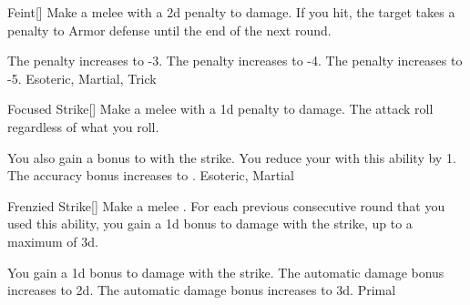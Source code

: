 \lowercase{\hypertarget{maneuver:Feint}{}}\label{maneuver:Feint}
\hypertarget{maneuver:Feint}{}
\begin{freeability}[Rank 1]{Feint}[]
Make a melee  with a \minus2d penalty to damage.
If you hit, the target takes a  penalty to Armor defense until the end of the next round.

\rankline
{} The penalty increases to -3.
 The penalty increases to -4.
 The penalty increases to -5.
 Esoteric, Martial, Trick
\end{freeability}
\vspace{0.25em}



\lowercase{\hypertarget{maneuver:Focused Strike}{}}\label{maneuver:Focused Strike}
\hypertarget{maneuver:Focused Strike}{}
\begin{freeability}[Rank 1]{Focused Strike}[]
Make a melee  with a \minus1d penalty to damage.
The attack roll  regardless of what you roll.

\rankline
{} You also gain a  bonus to  with the strike.
 You reduce your  with this ability by 1.
 The accuracy bonus increases to .
 Esoteric, Martial
\end{freeability}
\vspace{0.25em}



\lowercase{\hypertarget{maneuver:Frenzied Strike}{}}\label{maneuver:Frenzied Strike}
\hypertarget{maneuver:Frenzied Strike}{}
\begin{freeability}[Rank 1]{Frenzied Strike}[]
Make a melee .
For each previous consecutive round that you used this ability, you gain a \plus1d bonus to damage with the strike, up to a maximum of \plus3d.

\rankline
{} You gain a \plus1d bonus to damage with the strike.
 The automatic damage bonus increases to \plus2d.
 The automatic damage bonus increases to \plus3d.
 Primal
\end{freeability}
\vspace{0.25em}



